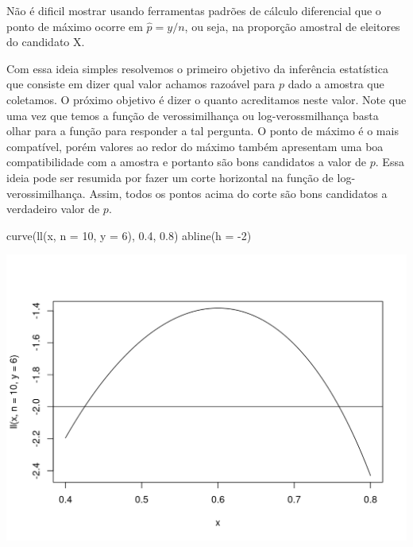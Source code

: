 \documentclass[
  10pt,
  a4paper]{book}
\newenvironment{Shaded}{\begin{snugshade}}{\end{snugshade}}
\newcommand{\AttributeTok}[1]{\textcolor[rgb]{0.77,0.63,0.00}{#1}}
\newcommand{\DecValTok}[1]{\textcolor[rgb]{0.00,0.00,0.81}{#1}}
\newcommand{\FloatTok}[1]{\textcolor[rgb]{0.00,0.00,0.81}{#1}}
\newcommand{\FunctionTok}[1]{\textcolor[rgb]{0.00,0.00,0.00}{#1}}
\newcommand{\NormalTok}[1]{#1}
\newcommand{\SpecialCharTok}[1]{\textcolor[rgb]{0.00,0.00,0.00}{#1}}
\begin{document}
Não é dificil mostrar usando ferramentas padrões de cálculo diferencial que o ponto de máximo ocorre em \(\hat{p} = y/n\), ou seja, na proporção amostral de eleitores do candidato X.

Com essa ideia simples resolvemos o primeiro objetivo da inferência estatística que consiste em dizer qual valor achamos razoável para \(p\) dado a amostra que coletamos.
O próximo objetivo é dizer o quanto acreditamos neste valor. Note que uma vez que temos a função de verossimilhança ou log-verossmilhança basta olhar para a função para responder a tal pergunta. O ponto de máximo é o mais compatível, porém valores ao redor do máximo também apresentam uma boa compatibilidade com a amostra e portanto são bons candidatos a valor de \(p\). Essa ideia pode ser resumida por fazer um corte horizontal na função de log-verossimilhança. Assim, todos os pontos acima do corte são bons candidatos a verdadeiro valor de \(p\).

\begin{Shaded}
\begin{Highlighting}[]
\FunctionTok{curve}\NormalTok{(}\FunctionTok{ll}\NormalTok{(x, }\AttributeTok{n =} \DecValTok{10}\NormalTok{, }\AttributeTok{y =} \DecValTok{6}\NormalTok{), }\FloatTok{0.4}\NormalTok{, }\FloatTok{0.8}\NormalTok{)}
\FunctionTok{abline}\NormalTok{(}\AttributeTok{h =} \SpecialCharTok{{-}}\DecValTok{2}\NormalTok{)}
\end{Highlighting}
\end{Shaded}

\begin{center}\includegraphics{figures/unnamed-chunk-378-1} \end{center}
\end{document}
